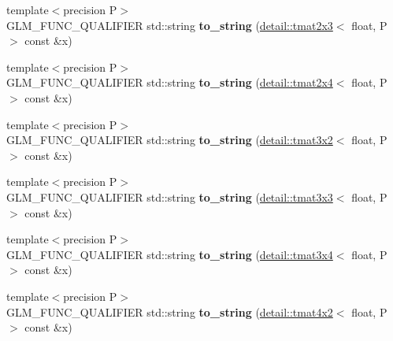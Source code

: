 \begin{DoxyCompactItemize}
\item 
{\footnotesize template$<$precision P$>$ }\\G\+L\+M\+\_\+\+F\+U\+N\+C\+\_\+\+Q\+U\+A\+L\+I\+F\+I\+ER std\+::string {\bfseries to\+\_\+string} (\hyperlink{structglm_1_1detail_1_1tmat2x3}{detail\+::tmat2x3}$<$ float, P $>$ const \&x)\hypertarget{namespaceglm_ad89901ec5f12738b9a642525e49c8913}{}\label{namespaceglm_ad89901ec5f12738b9a642525e49c8913}

\item 
{\footnotesize template$<$precision P$>$ }\\G\+L\+M\+\_\+\+F\+U\+N\+C\+\_\+\+Q\+U\+A\+L\+I\+F\+I\+ER std\+::string {\bfseries to\+\_\+string} (\hyperlink{structglm_1_1detail_1_1tmat2x4}{detail\+::tmat2x4}$<$ float, P $>$ const \&x)\hypertarget{namespaceglm_a615c6db6a316268f62953ebb73948003}{}\label{namespaceglm_a615c6db6a316268f62953ebb73948003}

\item 
{\footnotesize template$<$precision P$>$ }\\G\+L\+M\+\_\+\+F\+U\+N\+C\+\_\+\+Q\+U\+A\+L\+I\+F\+I\+ER std\+::string {\bfseries to\+\_\+string} (\hyperlink{structglm_1_1detail_1_1tmat3x2}{detail\+::tmat3x2}$<$ float, P $>$ const \&x)\hypertarget{namespaceglm_a2f0a810251017c8150a5e3a3cffd6145}{}\label{namespaceglm_a2f0a810251017c8150a5e3a3cffd6145}

\item 
{\footnotesize template$<$precision P$>$ }\\G\+L\+M\+\_\+\+F\+U\+N\+C\+\_\+\+Q\+U\+A\+L\+I\+F\+I\+ER std\+::string {\bfseries to\+\_\+string} (\hyperlink{structglm_1_1detail_1_1tmat3x3}{detail\+::tmat3x3}$<$ float, P $>$ const \&x)\hypertarget{namespaceglm_a928a5ae6ba9cce412e20c4cc82420df5}{}\label{namespaceglm_a928a5ae6ba9cce412e20c4cc82420df5}

\item 
{\footnotesize template$<$precision P$>$ }\\G\+L\+M\+\_\+\+F\+U\+N\+C\+\_\+\+Q\+U\+A\+L\+I\+F\+I\+ER std\+::string {\bfseries to\+\_\+string} (\hyperlink{structglm_1_1detail_1_1tmat3x4}{detail\+::tmat3x4}$<$ float, P $>$ const \&x)\hypertarget{namespaceglm_aaad0b48ed82b5b2cdddeb76e3789abd1}{}\label{namespaceglm_aaad0b48ed82b5b2cdddeb76e3789abd1}

\item 
{\footnotesize template$<$precision P$>$ }\\G\+L\+M\+\_\+\+F\+U\+N\+C\+\_\+\+Q\+U\+A\+L\+I\+F\+I\+ER std\+::string {\bfseries to\+\_\+string} (\hyperlink{structglm_1_1detail_1_1tmat4x2}{detail\+::tmat4x2}$<$ float, P $>$ const \&x)\hypertarget{namespaceglm_ad10393d7027f19f386ff2cf7fa24ccfd}{}\label{namespaceglm_ad10393d7027f19f386ff2cf7fa24ccfd}


\end{DoxyCompactItemize}

